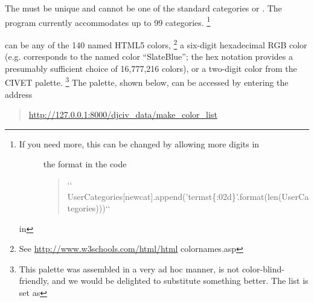 \documentclass[letterpaper,10pt,english]{sphinxmanual}
\begin{document}
The  must be unique and cannot be one of the standard
categories  or . The program currently
accommodates up to 99 categories. \footnote{\begin{description}
\item[{If you need more, this can be changed by allowing more digits in}] \leavevmode
the  format in the code
\begin{quote}

{}`{}` UserCategories{[}newcat{]}.append(’termst\{:02d\}’.format(len(UserCategories))){}`{}`
\end{quote}

\end{description}

in 
}

\begin{DUlineblock}{0em}
\item[]  can be any of the 140 named HTML5 colors, \footnote{
See \href{http://www.w3schools.com/html/html}{http://www.w3schools.com/html/html} colornames.asp
} a six-digit
hexadecimal RGB color (e.g.  corresponds to the named color
“SlateBlue”; the hex notation provides a presumably sufficient choice
of 16,777,216 colors), or a two-digit color from the CIVET
palette. \footnote{
This palette was assembled in a very ad hoc manner, is not
color-blind-friendly, and we would be delighted to substitute
something better. The list is set as 
} The palette, shown below, can be
accessed by entering the address
\end{DUlineblock}
\begin{quote}

\href{http://127.0.0.1:8000/djciv\_data/make\_color\_list}{http://127.0.0.1:8000/djciv\_data/make\_color\_list}
\end{quote}
\end{document}
